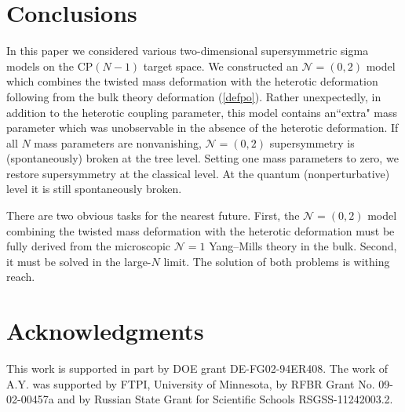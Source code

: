 \documentclass[12pt]{article}
\newcommand{\ntwoo}{${\mathcal N}= \left(0,2\right) $ }
\newcommand{\none}{${\mathcal N}=1$ }
\begin{document}
	
\section{Conclusions}
\label{con}

In this paper we considered various two-dimensional supersymmetric sigma models on the CP$(N-1)$
target space. We constructed an \ntwoo  model which combines the twisted mass deformation 
with the heterotic deformation following from
the bulk theory deformation (\ref{defpo}). Rather unexpectedly, in addition to the heterotic coupling parameter,
this model  contains an``extra" mass parameter which was unobservable in the absence of the heterotic deformation.
If all $N$ mass parameters are nonvanishing, \ntwoo supersymmetry is (spontaneously) broken at
the tree level. Setting one  mass parameters to zero, we restore supersymmetry at the classical 
level. At the quantum (nonperturbative) level it is still spontaneously broken.

There are two obvious tasks for the nearest future. First, the \ntwoo  model   combining the twisted mass deformation 
with the heterotic deformation must be fully derived from the microscopic \none Yang--Mills theory in the bulk.
Second, it must be solved in the large-$N$ limit. The solution of both problems is withing reach.
	
	
\section*{Acknowledgments}
This work  is supported in part by DOE grant DE-FG02-94ER408. 
The work of A.Y. was  supported 
by  FTPI, University of Minnesota, 
by RFBR Grant No. 09-02-00457a 
and by Russian State Grant for 
Scientific Schools RSGSS-11242003.2.
\end{document}
